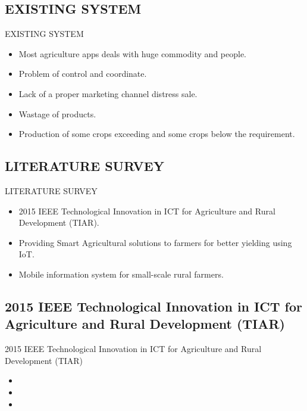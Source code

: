   \subsection{EXISTING SYSTEM}
  \begin{frame}{EXISTING SYSTEM}
  \begin{itemize}
  \item Most agriculture apps deals with huge commodity and people.
  \item Problem of control and coordinate.
  \item Lack of a proper marketing channel distress sale.
  \item Wastage of products.
  \item Production of some crops exceeding and some crops below the requirement.
  \end{itemize}
  \end{frame}
    
  \subsection{LITERATURE SURVEY}
  \begin{frame}{LITERATURE SURVEY}
  \begin{itemize}
  \item 2015 IEEE Technological Innovation in ICT for Agriculture and Rural Development (TIAR).
  \item Providing Smart Agricultural solutions to farmers for better yielding using IoT.
  \item  Mobile information system for small-scale rural farmers.
  \end{itemize}
  \end{frame}
  
  \subsection{2015 IEEE Technological Innovation in ICT for Agriculture and Rural Development (TIAR)}
  \begin{frame}{2015 IEEE Technological Innovation in ICT for Agriculture and Rural Development (TIAR)}
  \begin{itemize}
  \item 
  \item 
  \item 
  \end{itemize}
  \end{frame}
  
